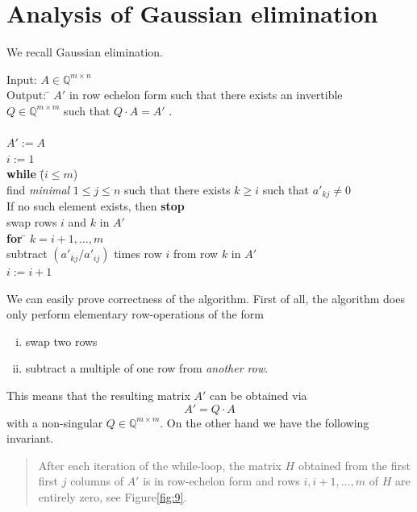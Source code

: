 \section{Analysis of Gaussian elimination} 
\label{sec:analys-gauss-elim}

We recall Gaussian elimination. 

\begin{algorithm}
  \label{alg:3}
  \begin{tabbing}
    Input: $A ∈ ℚ^{m ×n}$  \\
    Output: \= $A'$ in row echelon form such that there exists an invertible \\ 
            \> $Q ∈ ℚ^{m × m}$ such that $Q⋅A = A'$ . \\
            \pushtabs 
\\
$A' := A$ \\
$i := 1$\\
{\bf while} \=  ($i≤m$)  \\
\> find \emph{minimal} $1 ≤ j ≤n$ such that there exists $k≥i$ such that $a'_{kj} ≠ 0$ \\
\> If no such element exists, then {\bf stop} \\
            \> swap rows $i$ and $k$ in $A'$ \\
            \>  {\bf for} \= $k = i+1,\dots, m$ \\
            \>            \> subtract $(a'_{kj}/a'_{ij})$ times row $i$ from row $k$ in $A'$  \\
\> $i:=i+1$ 
\poptabs        
  \end{tabbing}
\end{algorithm}

\noindent 
We can easily prove correctness of the algorithm. First of all, the algorithm does only perform elementary row-operations of the form 
\begin{enumerate}[i)]
\item swap two rows 
\item subtract a multiple of one row from \emph{another row}. 
\end{enumerate}
This means that the resulting matrix $A'$ can be obtained via 
\begin{displaymath}
  A' = Q ⋅ A
\end{displaymath}
with a non-singular $Q ∈ ℚ^{m × m}$. On the other hand we have the following invariant. 
\begin{quote}
  After each iteration of the while-loop, the matrix $H$ obtained from the first  first $j$ columns of $A'$ is  in row-echelon form and rows $i,i+1,\dots,m$ of $H$  are entirely zero, see Figure\ref{fig:9}.  
\end{quote}

